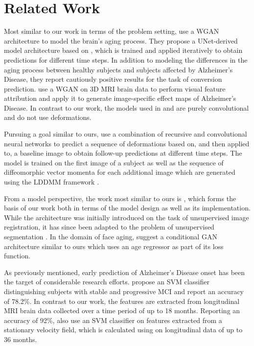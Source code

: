 \section{Related Work}
Most similar to our work in terms of the problem setting, \cite{wegmayr2019generative} use a WGAN architecture to model the brain's aging process. They propose a UNet-derived \cite{ronneberger2015unet} model architecture based on \cite{baumgartner2018visual}, which is trained and applied iteratively to obtain predictions for different time steps. In addition to modeling the differences in the aging process between healthy subjects and subjects affected by Alzheimer's Disease, they report cautiously positive results for the task of conversion prediction.
\cite{baumgartner2018visual} use a WGAN on 3D MRI brain data to perform visual feature attribution and apply it to generate image-specific effect maps of Alzheimer's Disease.
In contrast to our work, the models used in \cite{wegmayr2019generative} and \cite{baumgartner2018visual} are purely convolutional and do not use deformations.

Pursuing a goal similar to ours, \cite{pathan2018predictive} use a combination of recursive and convolutional neural networks to predict a sequence of deformations based on, and then applied to, a baseline image to obtain follow-up predictions at different time steps. The model is trained on the first image of a subject as well as the sequence of diffeomorphic vector momenta for each additional image which are generated using the LDDMM framework \cite{beg2005computing}.

From a model perspective, the work most similar to ours is \cite{balakrishnan2019voxelmorph} \cite{dalca2018unsupervised}, which forms the basis of our work both in terms of the model design as well as its implementation. While the architecture was initially introduced on the task of unsupervised image registration, it has since been adapted to the problem of unsupervised segmentation \cite{dalca2019unsupervised}.
In the domain of face aging, \cite{palsson2018generative} suggest a conditional GAN \cite{mirza2014conditional} architecture similar to ours which uses an age regressor as part of its loss function.

As previously mentioned, early prediction of Alzheimer's Disease onset has been the target of considerable research efforts. \cite{thung2016identification} propose an SVM classifier distinguishing subjects with stable and progressive MCI and report an accuracy of 78.2\%. In contrast to our work, the features are extracted from longitudinal MRI brain data collected over a time period of up to 18 months.
Reporting an accuracy of 92\%, \cite{sun2017detection} also use an SVM classifier on features extracted from a stationary velocity field, which is calculated using \cite{vercauteren2009diffeomorphic} on longitudinal data of up to 36 months.


